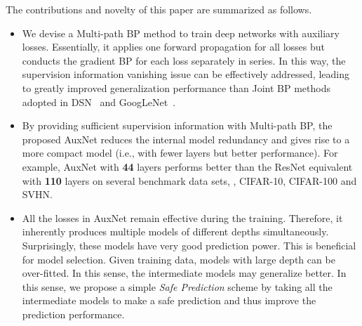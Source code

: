 \documentclass[10pt,onecolumn,letterpaper]{article}
\def\SexyName{AuxNet\xspace}
\begin{document}
The contributions  and novelty of this paper are summarized as follows.
\begin{itemize}
\vspace{-0.5em}
\item We devise a Multi-path BP method to train deep networks with auxiliary losses. Essentially, it applies one forward propagation for all losses but conducts the gradient BP for each loss separately in series. In this way, the supervision information vanishing issue can be effectively addressed, leading to greatly improved generalization performance than Joint BP methods adopted in DSN~\cite{Lee2015} and GoogLeNet~\cite{szegedy2015going}.
\vspace{-0.5em}
\item By providing sufficient supervision information with Multi-path BP, the proposed \SexyName reduces the internal model redundancy and gives rise to a more compact model (i.e., with fewer layers but better performance). For example, AuxNet with \textbf{44} layers performs better than the ResNet equivalent with \textbf{110} layers on several benchmark data sets, \ie, CIFAR-10, CIFAR-100 and SVHN.
\vspace{-0.5em}
\item All the losses in \SexyName remain effective during the training. Therefore, it inherently produces multiple models of different depths simultaneously. Surprisingly, these models have very good prediction power. This is beneficial for model selection. Given training data, models with large depth can be over-fitted. In this sense, the intermediate models may generalize better. In this sense, we propose a simple \emph{Safe Prediction} scheme by taking all the intermediate models to make a safe prediction and thus improve the prediction performance.


\end{itemize}
\end{document}

